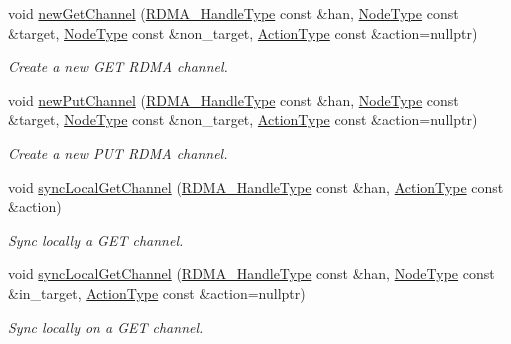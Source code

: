 \begin{DoxyCompactItemize}
void \hyperlink{structvt_1_1rdma_1_1_r_d_m_a_manager_a6a3ecf9512915681304ccd0126ec531f}{new\+Get\+Channel} (\hyperlink{namespacevt_a10442579ec4e7ebef223818e64bcf908}{R\+D\+M\+A\+\_\+\+Handle\+Type} const \&han, \hyperlink{namespacevt_a866da9d0efc19c0a1ce79e9e492f47e2}{Node\+Type} const \&target, \hyperlink{namespacevt_a866da9d0efc19c0a1ce79e9e492f47e2}{Node\+Type} const \&non\+\_\+target, \hyperlink{namespacevt_ae0a5a7b18cc99d7b732cb4d44f46b0f3}{Action\+Type} const \&action=nullptr)
\begin{DoxyCompactList}\small\item\em Create a new G\+ET R\+D\+MA channel. \end{DoxyCompactList}\item 
void \hyperlink{structvt_1_1rdma_1_1_r_d_m_a_manager_ae64c8e90dc45fcd44129e4c62f3b65ea}{new\+Put\+Channel} (\hyperlink{namespacevt_a10442579ec4e7ebef223818e64bcf908}{R\+D\+M\+A\+\_\+\+Handle\+Type} const \&han, \hyperlink{namespacevt_a866da9d0efc19c0a1ce79e9e492f47e2}{Node\+Type} const \&target, \hyperlink{namespacevt_a866da9d0efc19c0a1ce79e9e492f47e2}{Node\+Type} const \&non\+\_\+target, \hyperlink{namespacevt_ae0a5a7b18cc99d7b732cb4d44f46b0f3}{Action\+Type} const \&action=nullptr)
\begin{DoxyCompactList}\small\item\em Create a new P\+UT R\+D\+MA channel. \end{DoxyCompactList}\item 
void \hyperlink{structvt_1_1rdma_1_1_r_d_m_a_manager_a85e3bd458484375b762492ed0d65d9f5}{sync\+Local\+Get\+Channel} (\hyperlink{namespacevt_a10442579ec4e7ebef223818e64bcf908}{R\+D\+M\+A\+\_\+\+Handle\+Type} const \&han, \hyperlink{namespacevt_ae0a5a7b18cc99d7b732cb4d44f46b0f3}{Action\+Type} const \&action)
\begin{DoxyCompactList}\small\item\em Sync locally a G\+ET channel. \end{DoxyCompactList}\item 
void \hyperlink{structvt_1_1rdma_1_1_r_d_m_a_manager_aa38b010741db4c375e22662870549dd9}{sync\+Local\+Get\+Channel} (\hyperlink{namespacevt_a10442579ec4e7ebef223818e64bcf908}{R\+D\+M\+A\+\_\+\+Handle\+Type} const \&han, \hyperlink{namespacevt_a866da9d0efc19c0a1ce79e9e492f47e2}{Node\+Type} const \&in\+\_\+target, \hyperlink{namespacevt_ae0a5a7b18cc99d7b732cb4d44f46b0f3}{Action\+Type} const \&action=nullptr)
\begin{DoxyCompactList}\small\item\em Sync locally on a G\+ET channel. \end{DoxyCompactList}\item 

\end{DoxyCompactItemize}
